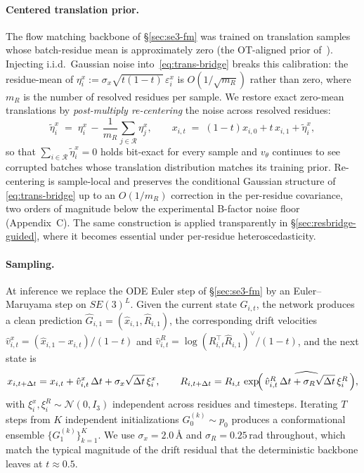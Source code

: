 \documentclass{article}
\begin{document}
\paragraph{Centered translation prior.}
The flow matching backbone of \S\ref{sec:se3-fm} was trained on translation samples whose batch-residue mean is approximately zero (the OT-aligned prior of~\cite{yim2023fast}). Injecting i.i.d.\ Gaussian noise into~\eqref{eq:trans-bridge} breaks this calibration: the residue-mean of $\eta^{x}_i:=\sigma_x\sqrt{t(1-t)}\,\varepsilon^{x}_i$ is $O(1/\sqrt{m_R})$ rather than zero, where $m_R$ is the number of resolved residues per sample. We restore exact zero-mean translations by \emph{post-multiply re-centering} the noise across resolved residues:
\begin{equation}
\tilde\eta^{x}_{i}\;=\;\eta^{x}_{i}\,-\,\frac{1}{m_R}\!\!\sum_{j\in\mathcal{R}}\!\eta^{x}_{j},
\qquad
x_{i,t}\;=\;(1-t)x_{i,0}+t\,x_{i,1}+\tilde\eta^{x}_{i},
\label{eq:trans-recenter}
\end{equation}
so that $\sum_{i\in\mathcal{R}}\tilde\eta^{x}_{i}=0$ holds bit-exact for every sample and $v_\theta$ continues to see corrupted batches whose translation distribution matches its training prior. Re-centering is sample-local and preserves the conditional Gaussian structure of \eqref{eq:trans-bridge} up to an $O(1/m_R)$ correction in the per-residue covariance, two orders of magnitude below the experimental B-factor noise floor (Appendix~C). The same construction is applied transparently in \S\ref{sec:resbridge-guided}, where it becomes essential under per-residue heteroscedasticity.

\paragraph{Sampling.}
At inference we replace the ODE Euler step of \S\ref{sec:se3-fm} by an Euler--Maruyama step on $SE(3)^L$. Given the current state $G_{i,t}$, the network produces a clean prediction $\hat{G}_{i,1}=(\hat{x}_{i,1},\hat{R}_{i,1})$, the corresponding drift velocities $\hat{v}^{x}_{i,t}=(\hat{x}_{i,1}-x_{i,t})/(1-t)$ and $\hat{v}^{R}_{i,t}=\log(R_{i,t}^{\!\top}\hat{R}_{i,1})^{\!\vee}/(1-t)$, and the next state is
\begin{equation}
x_{i,t+\Delta t}=x_{i,t}+\hat{v}^{x}_{i,t}\,\Delta t+\sigma_x\sqrt{\Delta t}\,\xi^{x}_i,
\qquad
R_{i,t+\Delta t}=R_{i,t}\,\exp\!\Bigl(\,\widehat{\hat{v}^{R}_{i,t}\,\Delta t+\sigma_R\sqrt{\Delta t}\,\xi^{R}_i}\,\Bigr),
\label{eq:bridge-em}
\end{equation}
with $\xi^{x}_i,\xi^{R}_i\!\sim\!\mathcal{N}(0,I_3)$ independent across residues and timesteps. Iterating $T$ steps from $K$ independent initializations $G_0^{(k)}\!\sim\!p_0$ produces a conformational ensemble $\{G_1^{(k)}\}_{k=1}^{K}$. We use $\sigma_x=2.0$\,{\AA} and $\sigma_R=0.25$\,rad throughout, which match the typical magnitude of the drift residual that the deterministic backbone leaves at $t\!\approx\!0.5$.
\end{document}
